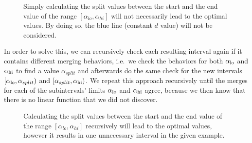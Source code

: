 \begin{figure}
    \centering
    \caption{Simply calculating the split values between the start and the end value of the range $[\alpha_{lo}, \alpha_{hi}]$ will not necessarily lead to the optimal values. By doing so, the blue line (constant $d$ value) will not be considered.}
    \label{fig:notoptimal}
\end{figure}

In order to solve this, we can recursively check each resulting interval again if it contains different merging behaviors, i.e.\ we check the behaviors for both $\alpha_\text{lo}$ and $\alpha_\text{hi}$ to find a value $\alpha_{split}$ and afterwards do the same check for the new intervals $[\alpha_\text{lo}, \alpha_{split})$ and $[\alpha_{split}, \alpha_\text{hi})$. We repeat this approach recursively until the merges for each of the subintervals' limits $\alpha_\text{lo}$ and $\alpha_\text{hi}$ agree, because we then know that there is no linear function that we did not discover.

\begin{figure}[H]
    \centering
    \caption{Calculating the split values between the start and the end value of the range $[\alpha_{lo}, \alpha_{hi}]$ recursively will lead to the optimal values, however it results in one unnecessary interval in the given example.}
    \label{fig:notoptimal2}
\end{figure}

